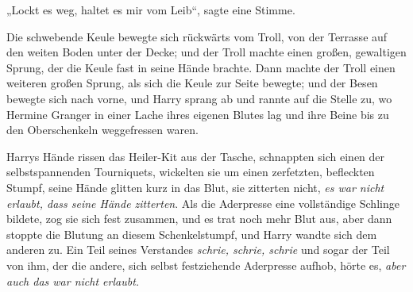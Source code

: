 „Lockt es weg, haltet es mir vom Leib“, sagte eine Stimme.

Die schwebende Keule bewegte sich rückwärts vom Troll, von der Terrasse auf den weiten Boden unter der Decke; und der Troll machte einen großen, gewaltigen Sprung, der die Keule fast in seine Hände brachte. Dann machte der Troll einen weiteren großen Sprung, als sich die Keule zur Seite bewegte; und der Besen bewegte sich nach vorne, und Harry sprang ab und rannte auf die Stelle zu, wo Hermine Granger in einer Lache ihres eigenen Blutes lag und ihre Beine bis zu den Oberschenkeln weggefressen waren.

Harrys Hände rissen das Heiler-Kit aus der Tasche, schnappten sich einen der selbstspannenden Tourniquets, wickelten sie um einen zerfetzten, befleckten Stumpf, seine Hände glitten kurz in das Blut, sie zitterten nicht, \emph{es war nicht erlaubt, dass seine Hände zitterten}. Als die Aderpresse eine vollständige Schlinge bildete, zog sie sich fest zusammen, und es trat noch mehr Blut aus, aber dann stoppte die Blutung an diesem Schenkelstumpf, und Harry wandte sich dem anderen zu. Ein Teil seines Verstandes \emph{schrie, schrie, schrie} und sogar der Teil von ihm, der die andere, sich selbst festziehende Aderpresse aufhob, hörte es, \emph{aber auch das war nicht erlaubt.}

